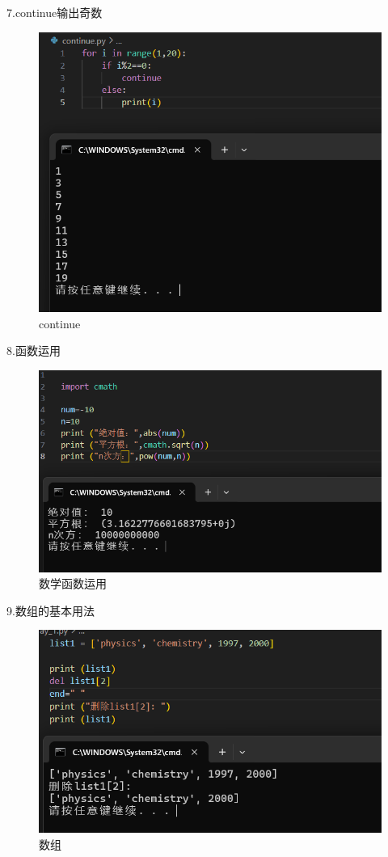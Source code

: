 \documentclass[a4paper, 12pt]{article}
\begin{document}
7.continue输出奇数
 \begin{figure}[H]
  \centering
  \includegraphics[width=1\textwidth]{屏幕截图 2024-09-12 104528.png}
  \caption{continue}
    \end{figure}

8.函数运用
 \begin{figure}[H]
  \centering
  \includegraphics[width=1\textwidth]{屏幕截图 2024-09-12 110705.png}
  \caption{数学函数运用}
    \end{figure}

9.数组的基本用法
 \begin{figure}[H]
  \centering
  \includegraphics[width=1\textwidth]{屏幕截图 2024-09-12 112311.png}
  \caption{数组}
    \end{figure}
\end{document}
